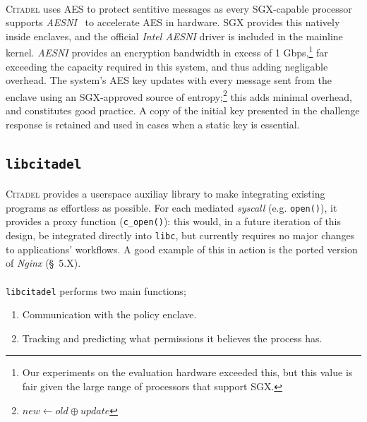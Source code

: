 \paragraph{} \textsc{Citadel} uses AES to protect sentitive messages as every SGX-capable processor supports \textit{AESNI}~\cite{aesni} to accelerate AES in hardware. SGX provides this natively inside enclaves, and the official \textit{Intel AESNI} driver is included in the mainline kernel. \textit{AESNI} provides an encryption bandwidth in excess of 1 Gbps,\footnote{Our experiments on the evaluation hardware exceeded this, but this value is fair given the large range of processors that support SGX.} far exceeding the capacity required in this system, and thus adding negligable overhead. The system's AES key updates with every message sent from the enclave using an SGX-approved source of entropy;\footnote{$new \leftarrow old \oplus update$} this adds minimal overhead, and constitutes good practice. A copy of the initial key presented in the challenge response is retained and used in cases when a static key is essential.

\subsection{\texttt{libcitadel}}
\label{sec:libcitadel}
\paragraph{} \textsc{Citadel} provides a userspace auxiliay library to make integrating existing programs as effortless as possible. For each mediated \textit{syscall} (e.g. \texttt{open()}), it provides a proxy function (\texttt{c\_open()}): this would, in a future iteration of this design, be integrated directly into \texttt{libc}, but currently requires no major changes to applications' workflows. A good example of this in action is the ported version of \textit{Nginx} (§~5.X).

\paragraph{} \texttt{libcitadel} performs two main functions;
\begin{enumerate}
    \item Communication with the policy enclave.
    \item Tracking and predicting what permissions it believes the process has.
\end{enumerate}

